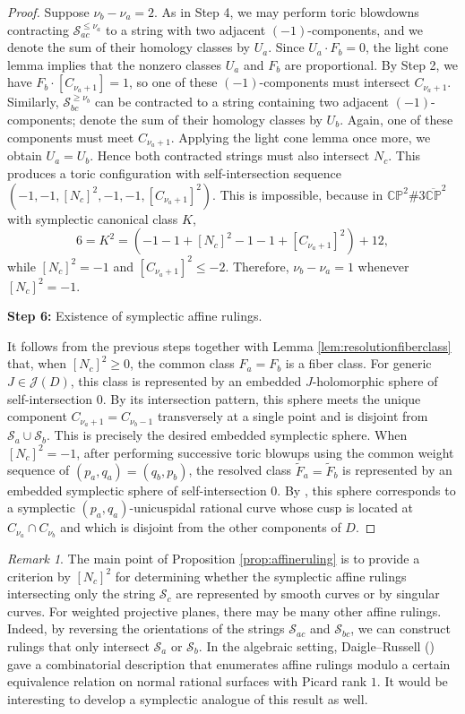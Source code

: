 \documentclass[11pt]{article}
\theoremstyle{definition}
\theoremstyle{remark}
\newtheorem{remark}[theorem]{Remark}
\newcommand{\CP}{\mathbb{CP}}
\newcommand{\st}{\mathcal{S}}
\begin{document}
\begin{proof}
Suppose $\nu_b-\nu_a=2$. As in Step 4, we may perform toric blowdowns contracting $\st_{ac}^{\leq \nu_a}$ to a string with two adjacent $(-1)$-components, and we denote the sum of their homology classes by $U_a$. Since $U_a\cdot F_b=0$, the light cone lemma implies that the nonzero classes $U_a$ and $F_b$ are proportional. By Step 2, we have $F_b\cdot [C_{\nu_a+1}]=1$, so one of these $(-1)$-components must intersect $C_{\nu_a+1}$. Similarly, $\st_{bc}^{\geq \nu_b}$ can be contracted to a string containing two adjacent $(-1)$-components; denote the sum of their homology classes by $U_b$. Again, one of these components must meet $C_{\nu_a+1}$. Applying the light cone lemma once more, we obtain $U_a=U_b$. Hence both contracted strings must also intersect $N_c$. This produces a toric configuration with self-intersection sequence $(-1,-1,[N_c]^2,-1,-1,[C_{\nu_a+1}]^2)$.
This is impossible, because in $\CP^2\#3\overline{\CP}^2$ with symplectic canonical class $K$,
\[6=K^2=(-1-1+[N_c]^2-1-1+[C_{\nu_a+1}]^2)+12,\]
while $[N_c]^2=-1$ and $[C_{\nu_a+1}]^2\leq -2$. Therefore, $\nu_b-\nu_a=1$ whenever $[N_c]^2=-1$.

\medskip
{\bf Step 6:} Existence of symplectic affine rulings.

It follows from the previous steps together with Lemma \ref{lem:resolutionfiberclass} that, when $[N_c]^2\geq 0$, the common class $F_a=F_b$ is a fiber class. For generic $J\in\mathcal{J}(D)$, this class is represented by an embedded $J$-holomorphic sphere of self-intersection $0$. By its intersection pattern, this sphere meets the unique component $C_{\nu_a+1}=C_{\nu_b-1}$ transversely at a single point and is disjoint from $\st_a\cup\st_b$. This is precisely the desired embedded symplectic sphere. When $[N_c]^2=-1$, after performing successive toric blowups using the common weight sequence of $(p_a,q_a)=(q_b,p_b)$, the resolved class $\tilde{F}_a=\tilde{F}_b$ is represented by an embedded symplectic sphere of self-intersection $0$. By \cite[Proposition 4.3.1]{McduffSiegel}, this sphere corresponds to a symplectic $(p_a,q_a)$-unicuspidal rational curve whose cusp is located at $C_{\nu_a}\cap C_{\nu_b}$ and which is disjoint from the other components of $D$.

\end{proof}

\begin{remark}
  The main point of Proposition \ref{prop:affineruling} is to provide a criterion by $[N_c]^2$ for determining whether the symplectic affine rulings intersecting only the string $\st_c$ are represented by smooth curves or by singular curves. For weighted projective planes, there may be many other affine rulings. Indeed, by reversing the orientations of the strings $\st_{ac}$ and $\st_{bc}$, we can construct rulings that only intersect $\st_a$ or $\st_b$. In the algebraic setting, Daigle--Russell (\cite{DP1,DP2}) gave a combinatorial description that enumerates affine rulings modulo a certain equivalence relation on normal rational surfaces with Picard rank $1$. It would be interesting to develop a symplectic analogue of this result as well.
\end{remark}
\end{document}
